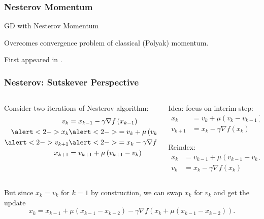 \documentclass[aspectratio=1610,onlytextwidth]{beamer}
\begin{document}
\begin{frame}[c]
  \frametitle{Nesterov Momentum}
  \begin{algorithm}[H]
    \KwData{$\gamma >0$, $\mu \in [0,1)$}
    \caption{GD with Nesterov Momentum}
  \end{algorithm}

  \bigskip

  Overcomes convergence problem of classical (Polyak) momentum.

  \bigskip

  First appeared in \textcite{nesterovMethodSolvingConvex1983}.

\end{frame}

\begin{frame}[c]
  \frametitle{Nesterov: Sutskever Perspective}
  \begin{columns}[T]
    \begin{column}{0.45\textwidth}
      Consider two iterations of Nesterov algorithm:
      \[
        \begin{aligned}
          v_{k}               & = x_{k-1} - \gamma \nabla f\left(x_{k-1} \right)         \\
          \alert<2->{x_{k}}   & \alert<2->{= v_{k} + \mu\left(v_{k} - v_{{k-1}} \right)} \\
          \alert<2->{v_{k+1}} & \alert<2->{= x_{k} - \gamma \nabla f\left(x_{k} \right)} \\
          x_{k+1}             & = v_{k+1} + \mu\left(v_{k+1} - v_{k} \right)
        \end{aligned}
      \]
    \end{column}

    \pause

    \begin{column}{0.45\textwidth}
      Idea: focus on interim step:
      \[
        \begin{aligned}
          x_{k}   & = v_{k} + \mu\left(v_{k} - v_{{k-1}} \right) \\
          v_{k+1} & = x_{k} - \gamma \nabla f\left(x_{k} \right)
        \end{aligned}
      \]

      \pause

      Reindex:
      \[
        \begin{aligned}
          x_{k} & = v_{k-1} + \mu\left(v_{k-1} - v_{{k-2}} \right) \\
          v_{k} & = x_{k} - \gamma \nabla f\left(x_{k} \right)
        \end{aligned}
      \]
    \end{column}

  \end{columns}

  \pause \bigskip

  But since $x_k = v_k$ for $k=1$ by construction, we can swap $x_k$ for $v_k$ and
  get the update
  \[
    x_k = x_{k-1} + \mu(x_{k-1} - x_{k-2}) - \gamma \nabla f(x_{k} + \mu(x_{k-1} - x_{k-2})).
  \]
\end{frame}
\end{document}

